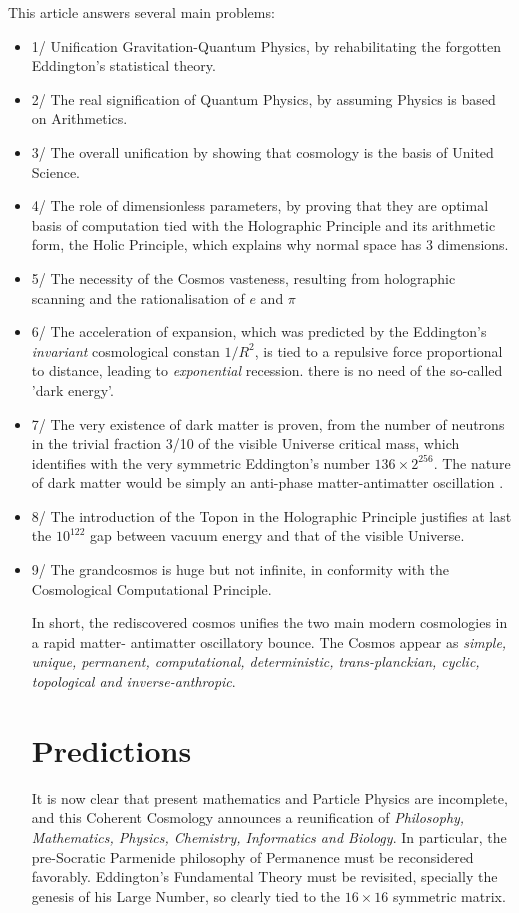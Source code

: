 \documentclass[twoside,draft]{article}
\begin{document}
\begin{sloppypar}
This article answers several main problems: 
\begin{itemize}
\item 1/ Unification Gravitation-Quantum Physics, by
rehabilitating the forgotten Eddington's statistical theory. 
\item 2/ The real signification of Quantum
Physics, by assuming Physics is based on Arithmetics. 
\item 3/ The overall unification by showing that
cosmology is the basis of United Science. 
\item 4/ The role of dimensionless parameters, by proving that
they are optimal basis of computation tied with the Holographic Principle and its arithmetic form,
the Holic Principle, which explains why normal space has 3 dimensions.
\item 5/ The necessity of the Cosmos vasteness, resulting from holographic scanning and the rationalisation of $e$ and $\pi$
\item 6/ The acceleration of expansion, which was predicted by the Eddington's \textit{invariant} cosmological constan $1/R^2$, is tied to a repulsive force proportional to distance, leading to \textit{exponential} recession. there is no need of the so-called 'dark energy'.
\item 7/ The very existence of dark matter is proven, from the number of neutrons in the trivial fraction 3/10 of the visible Universe critical mass, which identifies with the very symmetric Eddington's number $136 \times 2^{256}$. The nature of dark matter would be simply an anti-phase matter-antimatter oscillation \cite{Sanchez1}.  
\item 8/ The introduction of the Topon in the Holographic Principle justifies at last the $10^{122}$ gap between vacuum energy and that of the visible Universe.
\item 9/ The grandcosmos is huge but not infinite, in conformity with the Cosmological Computational Principle.

In short, the rediscovered cosmos unifies the two main modern cosmologies in a rapid matter-
antimatter oscillatory bounce. The Cosmos appear as \textit{simple, unique, permanent, computational,
deterministic, trans-planckian, cyclic, topological and inverse-anthropic}.

\section{Predictions}
It is now clear that present mathematics and Particle Physics are incomplete, and this Coherent Cosmology announces a reunification of \textit{Philosophy, Mathematics, Physics, Chemistry, Informatics and Biology}. In particular, the pre-Socratic Parmenide philosophy of Permanence must be reconsidered favorably. Eddington's Fundamental Theory must be revisited, specially the genesis of his Large Number, so clearly tied to the $16 \times 16$ symmetric matrix.


\end{itemize}
\end{sloppypar}
\end{document}
